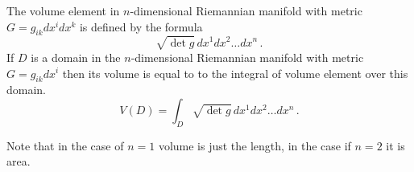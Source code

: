 \documentclass[12pt]{article}
\theoremstyle{theorem}
\numberwithin{equation}{section}
\begin{document}
   The volume element
in $n$-dimensional Riemannian manifold with metric $G=g_{ik}dx^i
    dx^k$ is defined by the formula
     \begin{equation}\label{volumelement}
  \sqrt {\det g}\,dx^1dx^2\dots dx^n\,.
\end{equation}
    If $D$ is a domain in the $n$-dimensional Riemannian manifold with metric
    $G=g_{ik}dx^i$
    then its volume is equal to to the integral of volume element over this domain.
          \begin{equation}\label{volumeofriemannianmanifold}
  V(D)=\int_D \sqrt {\det g}\,dx^1dx^2\dots dx^n\,.
\end{equation}


     Note that in the case of $n=1$ volume is just the length, in the case
     if $n=2$ it is area.
\end{document}
